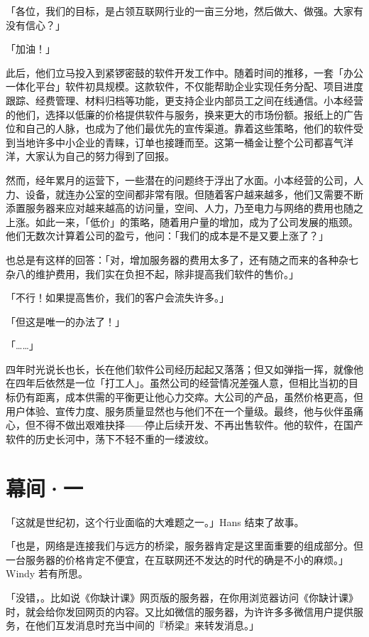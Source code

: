 「各位，我们的目标，是占领互联网行业的一亩三分地，然后做大、做强。大家有没有信心？」

「加油！」

此后，他们立马投入到紧锣密鼓的软件开发工作中。随着时间的推移，一套「办公一体化平台」软件初具规模。这款软件，不仅能帮助企业实现任务分配、项目进度跟踪、经费管理、材料归档等功能，更支持企业内部员工之间在线通信。小本经营的他们，选择以低廉的价格提供软件与服务，换来更大的市场份额。报纸上的广告位和自己的人脉，也成为了他们最优先的宣传渠道。靠着这些策略，他们的软件受到当地许多中小企业的青睐，订单也接踵而至。这第一桶金让整个公司都喜气洋洋，大家认为自己的努力得到了回报。

然而，经年累月的运营下，一些潜在的问题终于浮出了水面。小本经营的公司，人力、设备，就连办公室的空间都非常有限。但随着客户越来越多，他们又需要不断添置服务器来应对越来越高的访问量，空间、人力，乃至电力与网络的费用也随之上涨。如此一来，「低价」的策略，随着用户量的增加，成为了公司发展的瓶颈。他们无数次计算着公司的盈亏，他问：「我们的成本是不是又要上涨了？」

也总是有这样的回答：「对，增加服务器的费用太多了，还有随之而来的各种杂七杂八的维护费用，我们实在负担不起，除非提高我们软件的售价。」

「不行！如果提高售价，我们的客户会流失许多。」

「但这是唯一的办法了！」

「……」

四年时光说长也长，长在他们软件公司经历起起又落落；但又如弹指一挥，就像他在四年后依然是一位「打工人」。虽然公司的经营情况差强人意，但相比当初的目标仍有距离，成本供需的平衡更让他心力交瘁。大公司的产品，虽然价格更高，但用户体验、宣传力度、服务质量显然也与他们不在一个量级。最终，他与伙伴虽痛心，但不得不做出艰难抉择——停止后续开发、不再出售软件。他的软件，在国产软件的历史长河中，荡下不轻不重的一缕波纹。

\section{幕间·一}

「这就是世纪初，这个行业面临的大难题之一。」Hans 结束了故事。

「也是，网络是连接我们与远方的桥梁，服务器肯定是这里面重要的组成部分。但一台服务器的价格肯定不便宜，在互联网还不发达的时代的确是不小的麻烦。」Windy 若有所思。

「没错，。比如说《你缺计课》网页版的服务器，在你用浏览器访问《你缺计课》时，就会给你发回网页的内容。又比如微信的服务器，为许许多多微信用户提供服务，在他们互发消息时充当中间的『桥梁』来转发消息。」

